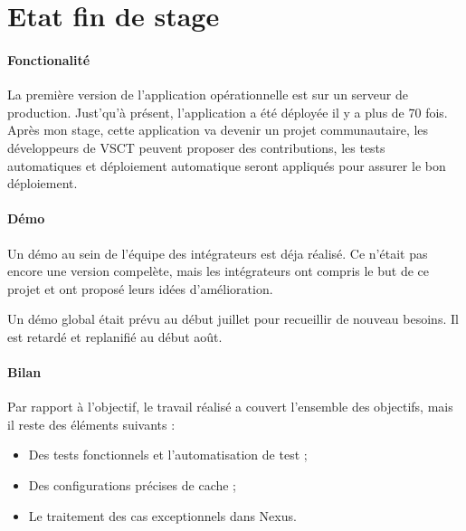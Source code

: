 \section{Etat fin de stage}

\paragraph{Fonctionalité}
La première version de l'application opérationnelle est sur un serveur de production.
Just'qu'à présent, l'application a été déployée il y a plus de 70 fois.
Après mon stage, cette application va devenir un projet communautaire,
les développeurs de VSCT peuvent proposer des contributions,
les tests automatiques et déploiement automatique seront appliqués pour assurer le bon déploiement.

\paragraph{Démo}
Un démo au sein de l'équipe des intégrateurs est déja réalisé.
Ce n'était pas encore une version compelète, mais les intégrateurs ont compris le but de ce projet et ont proposé leurs idées d'amélioration.

Un démo global était prévu au début juillet pour recueillir de nouveau besoins. Il est retardé et replanifié au début août.

\paragraph{Bilan}
Par rapport à l'objectif, le travail réalisé a couvert l'ensemble des objectifs, mais il reste des éléments suivants :
\begin{itemize}
  \item Des tests fonctionnels et l'automatisation de test ;
  \item Des configurations précises de cache ;
  \item Le traitement des cas exceptionnels dans Nexus.
\end{itemize}

\clearpage

